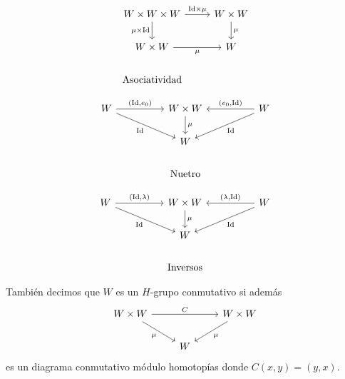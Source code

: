\documentclass[../../topologia_algebraica]{subfiles}
\begin{document}
\noindent\small\begin{minipage}{.29\textwidth}%
\[
  \begin{tikzcd}
    W\times W\times W \arrow[r, "\Id\times\mu"] \arrow[d,"\mu\times\Id"'] & W\times W \arrow[d,"\mu"] \\
    W\times W \arrow[r,"\mu"'] & W \\ \text{Asociatividad} &
  \end{tikzcd}
\]
 \end{minipage}
 \begin{minipage}{.34\textwidth}
\[
  \begin{tikzcd}
    W \arrow[rr,"(\Id\text{,}e_0)"] \arrow[rrd,"\Id"']& & W\times W \arrow[d,"\mu"]
    & & W \arrow[ll,"(e_0\text{,}\Id)"'] \arrow[lld,"\Id"]\\
    && W && \\ && \text{Nuetro} &&
  \end{tikzcd}
\]
\end{minipage}
\begin{minipage}{0.34\textwidth}
\[
  \begin{tikzcd}
    W \arrow[rr,"(\Id\text{,}\la)"] \arrow[rrd,"\Id"']& & W\times W \arrow[d,"\mu"]
    & & W \arrow[ll,"(\la\text{,}\Id)"'] \arrow[lld,"\Id"]\\
    && W && \\ && \text{Inversos} &&
  \end{tikzcd}
\]
\end{minipage}\normalsize%

\begin{nota}
  Tambi\'en decimos que $W$ es un $H$-grupo conmutativo si adem\'as
  \[
    \begin{tikzcd}
      W\times W \arrow[rr,"C"] \arrow[dr,"\mu"'] & & W\times W \arrow[dl,"\mu"] \\
      & W &     
    \end{tikzcd}
  \]
  es un diagrama conmutativo m\'odulo homotop\'ias donde $C(x,y)=(y,x)$.
\end{nota}
\end{document}
